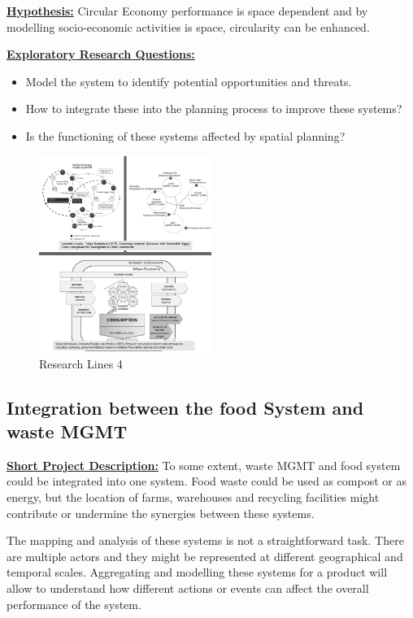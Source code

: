 \textbf{\underline {Hypothesis:}}  Circular Economy performance is space dependent and by modelling socio-economic activities is space, circularity can be enhanced.  \par


\textbf{\underline {Exploratory Research Questions: }}  
\begin{itemize}
    \item Model the system to identify potential opportunities and threats.
    \item How to integrate these into the planning process to improve these systems?
    \item Is the functioning of these systems affected by spatial planning?
\end{itemize}

\begin{figure}[hbt!]
    \centering
    \includegraphics[width=0.5\textwidth]{Imgs/rl_4.PNG}
    \caption{Research Lines 4}
    \label{fig:rl4}
\end{figure}




\subsection{Integration between the food System and waste MGMT}
\textbf{\underline {Short Project Description:}} To some extent, waste MGMT and food system could be integrated into one system. Food waste could be used as compost or as energy, but the location of farms, warehouses and recycling facilities might contribute or undermine the synergies between these systems. \par

The mapping and analysis of these systems is not a straightforward task. There are multiple actors and they might be represented at different geographical and temporal scales. Aggregating and modelling these systems for a product will allow to understand how different actions or events can affect the overall performance of the system.  \par

